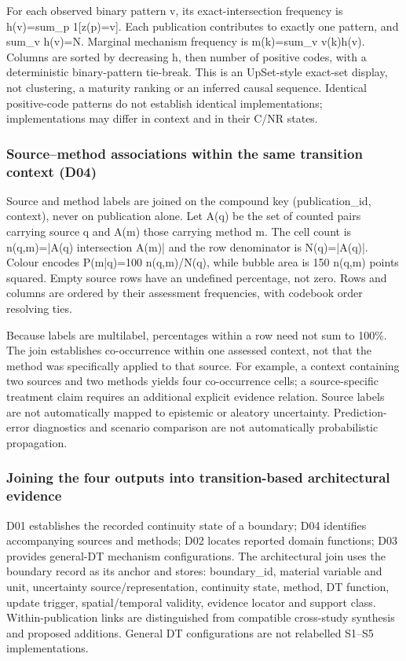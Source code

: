 For each observed binary pattern v, its exact-intersection frequency is h(v)=sum\_p 1[z(p)=v]. Each publication contributes to exactly one pattern, and sum\_v h(v)=N. Marginal mechanism frequency is m(k)=sum\_v v(k)h(v). Columns are sorted by decreasing h, then number of positive codes, with a deterministic binary-pattern tie-break. This is an UpSet-style exact-set display, not clustering, a maturity ranking or an inferred causal sequence. Identical positive-code patterns do not establish identical implementations; implementations may differ in context and in their C/NR states.

\subsubsection{Source–method associations within the same transition context (D04)}
Source and method labels are joined on the compound key (publication\_id, context), never on publication alone. Let A(q) be the set of counted pairs carrying source q and A(m) those carrying method m. The cell count is n(q,m)=|A(q) intersection A(m)| and the row denominator is N(q)=|A(q)|. Colour encodes P(m|q)=100 n(q,m)/N(q), while bubble area is 150 n(q,m) points squared. Empty source rows have an undefined percentage, not zero. Rows and columns are ordered by their assessment frequencies, with codebook order resolving ties.

Because labels are multilabel, percentages within a row need not sum to 100\%. The join establishes co-occurrence within one assessed context, not that the method was specifically applied to that source. For example, a context containing two sources and two methods yields four co-occurrence cells; a source-specific treatment claim requires an additional explicit evidence relation. Source labels are not automatically mapped to epistemic or aleatory uncertainty. Prediction-error diagnostics and scenario comparison are not automatically probabilistic propagation.

\subsubsection{Joining the four outputs into transition-based architectural evidence}
D01 establishes the recorded continuity state of a boundary; D04 identifies accompanying sources and methods; D02 locates reported domain functions; D03 provides general-DT mechanism configurations. The architectural join uses the boundary record as its anchor and stores: boundary\_id, material variable and unit, uncertainty source/representation, continuity state, method, DT function, update trigger, spatial/temporal validity, evidence locator and support class. Within-publication links are distinguished from compatible cross-study synthesis and proposed additions. General DT configurations are not relabelled S1–S5 implementations.

